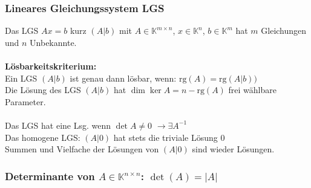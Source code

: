 \documentclass[6pt,a4paper]{scrartcl}
\begin{document}
\begin{multicols*}{4}
\subsubsection{Lineares Gleichungssystem LGS}
Das LGS $Ax=b$ kurz $(A|b)$ mit $A\in \mathbb K^{m\times n}$, $x\in \mathbb K^n$, $b\in \mathbb K^m$ hat $m$ Gleichungen und $n$ Unbekannte.\\
\\
\textbf{Lösbarkeitskriterium:}\\
Ein LGS $(A|b)$ ist genau dann lösbar, wenn: $\mathrm{rg}(A)=\mathrm{rg}(A|b))$\\
Die Lösung des LGS $(A|b)$ hat $\dim{\ker A} = n-\mathrm{rg}(A)$ frei wählbare Parameter.\\
\\
Das LGS hat eine Lsg. wenn $\det A \not= 0$ \quad $\rightarrow \exists A^{-1}$ \\
Das homogene LGS: $(A|0)$ hat stets die triviale Lösung $0$\\
Summen und Vielfache der Lösungen von $(A|0)$ sind wieder Lösungen.

\subsubsection{Determinante von $A\in \mathbb K^{n\times n}$: $\det(A)=|A|$}


\end{multicols*}
\end{document}
